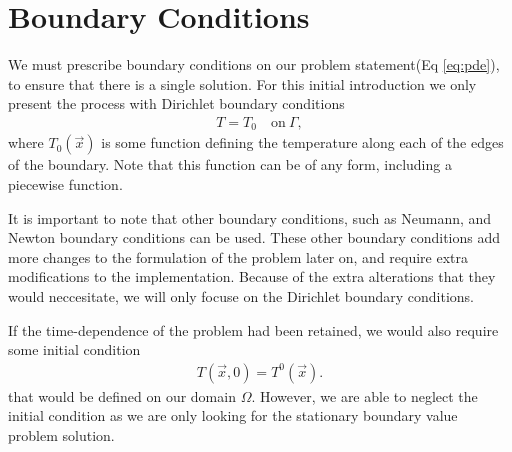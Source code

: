 \documentclass[../fem.tex]{subfiles}
\begin{document}
\section{Boundary Conditions}%
\label{sec:boundary_conditions}

We must prescribe boundary conditions on our problem statement(Eq
\ref{eq:pde}), to ensure that there is a single solution. For this initial
introduction we only present the process with Dirichlet boundary conditions
\begin{align*}
  T=T_0\quad\text{on}\ \Gamma,
\end{align*}
where $T_0(\vec{x})$ is some function defining the temperature along each of
the edges of the boundary. Note that this function can be of any form,
including a piecewise function.

It is important to note that other boundary conditions, such as Neumann, and
Newton boundary conditions can be used. These other boundary conditions add
more changes to the formulation of the problem later on, and require extra
modifications to the implementation. Because of the extra alterations that they
would neccesitate, we will only focuse on the Dirichlet boundary conditions.

If the time-dependence of the problem had been retained, we would also require
some initial condition
\begin{align*}
  T(\vec{x}, 0) = T^0(\vec{x}).
\end{align*}
that would be defined on our domain $\Omega$. However, we are able to neglect
the initial condition as we are only looking for the stationary boundary value
problem solution.
\end{document}
